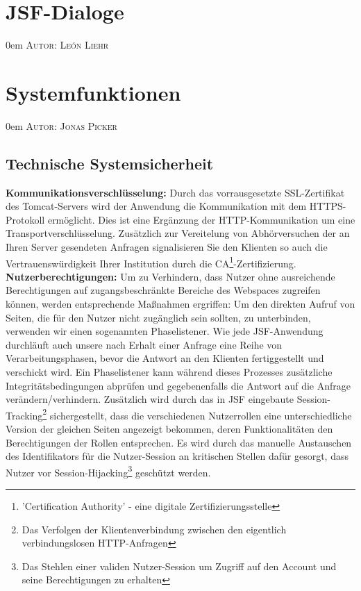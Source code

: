 \documentclass{article}
\makeatletter
\newcommand{\sectionauthor}[1]{
	{\parindent 0em \large \scshape Autor: #1 \par \nobreak \vspace*{1em}}
	\@afterheading
}
\makeatother
\begin{document}
\section{JSF-Dialoge}
\sectionauthor{León Liehr}

\section{Systemfunktionen}
\sectionauthor{Jonas Picker}
\subsection{Technische Systemsicherheit}
\noindent \textbf{Kommunikationsverschlüsselung:} Durch das vorrausgesetzte SSL-Zertifikat des Tomcat-Servers wird der Anwendung die Kommunikation mit dem HTTPS-Protokoll ermöglicht. Dies ist eine Ergänzung der HTTP-Kommunikation um eine Transportverschlüsselung. Zusätzlich zur Vereitelung von Abhörversuchen der an Ihren Server gesendeten Anfragen signalisieren Sie den Klienten so auch die Vertrauenswürdigkeit Ihrer Institution durch die CA\footnote{'Certification Authority' - eine digitale Zertifizierungsstelle}-Zertifizierung.\\
\textbf{Nutzerberechtigungen:} Um zu Verhindern, dass Nutzer ohne ausreichende Berechtigungen auf zugangsbeschränkte Bereiche des Webspaces zugreifen können, werden entsprechende Maßnahmen ergriffen: Um den direkten Aufruf von Seiten, die für den Nutzer nicht zugänglich sein sollten, zu unterbinden, verwenden wir einen sogenannten Phaselistener. Wie jede JSF-Anwendung durchläuft auch unsere nach Erhalt einer Anfrage eine Reihe von Verarbeitungsphasen, bevor die Antwort an den Klienten fertiggestellt und verschickt wird. Ein Phaselistener kann während dieses Prozesses zusätzliche Integritätsbedingungen abprüfen und gegebenenfalls die Antwort auf die Anfrage verändern/verhindern. Zusätzlich wird durch das in JSF eingebaute Session-Tracking\footnote{Das Verfolgen der Klientenverbindung zwischen den eigentlich verbindungslosen HTTP-Anfragen} sichergestellt, dass die verschiedenen Nutzerrollen eine unterschiedliche Version der gleichen Seiten angezeigt bekommen, deren Funktionalitäten den Berechtigungen der Rollen entsprechen. Es wird durch das manuelle Austauschen des Identifikators für die Nutzer-Session an kritischen Stellen dafür gesorgt, dass Nutzer vor Session-Hijacking\footnote{Das Stehlen einer validen Nutzer-Session um Zugriff auf den Account und seine Berechtigungen zu erhalten} geschützt werden.\\
\end{document}
